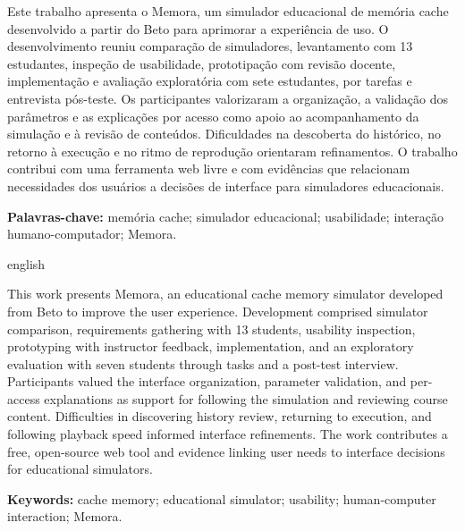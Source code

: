 \documentclass[article,12pt,oneside,a4paper,english,brazil]{abntex2}
\begin{document}
\frenchspacing
\setcounter{page}{0}
\maketitle
\thispagestyle{empty}
\setcounter{footnote}{4}
\begin{resumoumacoluna}[RESUMO]
Este trabalho apresenta o Memora, um simulador educacional de memória cache desenvolvido a partir do Beto para aprimorar a experiência de uso. O desenvolvimento reuniu comparação de simuladores, levantamento com 13 estudantes, inspeção de usabilidade, prototipação com revisão docente, implementação e avaliação exploratória com sete estudantes, por tarefas e entrevista pós-teste. Os participantes valorizaram a organização, a validação dos parâmetros e as explicações por acesso como apoio ao acompanhamento da simulação e à revisão de conteúdos. Dificuldades na descoberta do histórico, no retorno à execução e no ritmo de reprodução orientaram refinamentos. O trabalho contribui com uma ferramenta web livre e com evidências que relacionam necessidades dos usuários a decisões de interface para simuladores educacionais.
\par\vspace{\onelineskip}
\noindent\textbf{Palavras-chave:} memória cache; simulador educacional; usabilidade; interação humano-computador; Memora.
\end{resumoumacoluna}

\begin{otherlanguage*}{english}
\begin{resumoumacoluna}[ABSTRACT]
This work presents Memora, an educational cache memory simulator developed from Beto to improve the user experience. Development comprised simulator comparison, requirements gathering with 13 students, usability inspection, prototyping with instructor feedback, implementation, and an exploratory evaluation with seven students through tasks and a post-test interview. Participants valued the interface organization, parameter validation, and per-access explanations as support for following the simulation and reviewing course content. Difficulties in discovering history review, returning to execution, and following playback speed informed interface refinements. The work contributes a free, open-source web tool and evidence linking user needs to interface decisions for educational simulators.
\par\vspace{\onelineskip}
\noindent\textbf{Keywords:} cache memory; educational simulator; usability; human-computer interaction; Memora.
\end{resumoumacoluna}
\end{otherlanguage*}
\textual
\pagestyle{abntheadings}
\end{document}
